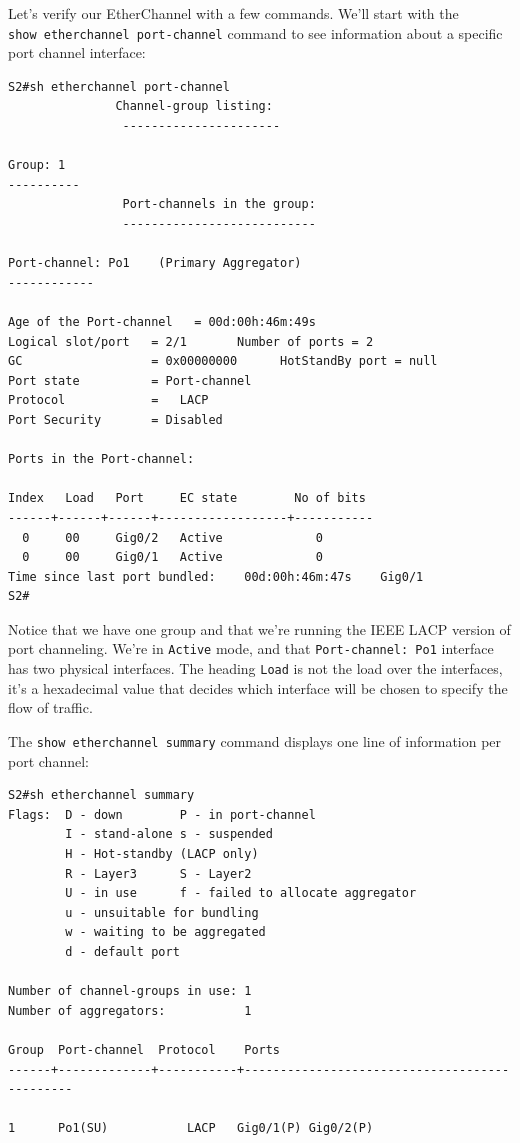 Let's verify our EtherChannel with a few commands. We'll start with the
\texttt{show\ etherchannel\ port-channel} command to see information
about a specific port channel interface:

\begin{verbatim}
S2#sh etherchannel port-channel
               Channel-group listing:
                ----------------------
 
Group: 1
----------
                Port-channels in the group:
                ---------------------------
 
Port-channel: Po1    (Primary Aggregator)
------------
 
Age of the Port-channel   = 00d:00h:46m:49s
Logical slot/port   = 2/1       Number of ports = 2
GC                  = 0x00000000      HotStandBy port = null
Port state          = Port-channel
Protocol            =   LACP
Port Security       = Disabled
 
Ports in the Port-channel:
 
Index   Load   Port     EC state        No of bits
------+------+------+------------------+-----------
  0     00     Gig0/2   Active             0
  0     00     Gig0/1   Active             0
Time since last port bundled:    00d:00h:46m:47s    Gig0/1
S2#
\end{verbatim}

Notice that we have one group and that we're running the IEEE LACP
version of port channeling. We're in \texttt{Active} mode, and that
\texttt{Port-channel:\ Po1} interface has two physical interfaces. The
heading \texttt{Load} is not the load over the interfaces, it's a
hexadecimal value that decides which interface will be chosen to specify
the flow of traffic.

The \texttt{show\ etherchannel\ summary} command displays one line of
information per port channel:

\begin{verbatim}
S2#sh etherchannel summary
Flags:  D - down        P - in port-channel
        I - stand-alone s - suspended
        H - Hot-standby (LACP only)
        R - Layer3      S - Layer2
        U - in use      f - failed to allocate aggregator
        u - unsuitable for bundling
        w - waiting to be aggregated
        d - default port
 
Number of channel-groups in use: 1
Number of aggregators:           1
 
Group  Port-channel  Protocol    Ports
------+-------------+-----------+----------------------------------------------
 
1      Po1(SU)           LACP   Gig0/1(P) Gig0/2(P)
\end{verbatim}

